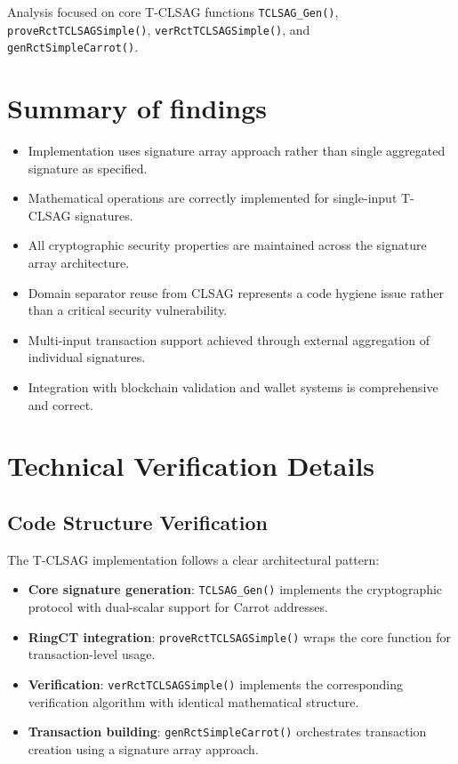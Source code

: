 \documentclass{article}
\begin{document}
Analysis focused on core T-CLSAG functions \texttt{TCLSAG\_Gen()}, \\
\texttt{proveRctTCLSAGSimple()}, \texttt{verRctTCLSAGSimple()}, and \\
\texttt{genRctSimpleCarrot()}.

\section{Summary of findings}
\begin{itemize}
  \item Implementation uses signature array approach rather than single 
        aggregated signature as specified.
  \item Mathematical operations are correctly implemented for single-input 
        T-CLSAG signatures.
  \item All cryptographic security properties are maintained across the 
        signature array architecture.
  \item Domain separator reuse from CLSAG represents a code hygiene issue 
        rather than a critical security vulnerability.
  \item Multi-input transaction support achieved through external aggregation 
        of individual signatures.
  \item Integration with blockchain validation and wallet systems is 
        comprehensive and correct.
\end{itemize}

\section{Technical Verification Details}

\subsection{Code Structure Verification}
The T-CLSAG implementation follows a clear architectural pattern:
\begin{itemize}
  \item \textbf{Core signature generation}: \texttt{TCLSAG\_Gen()} implements the cryptographic 
        protocol with dual-scalar support for Carrot addresses.
  \item \textbf{RingCT integration}: \texttt{proveRctTCLSAGSimple()} wraps the core function 
        for transaction-level usage.
  \item \textbf{Verification}: \texttt{verRctTCLSAGSimple()} implements the corresponding 
        verification algorithm with identical mathematical structure.
  \item \textbf{Transaction building}: \texttt{genRctSimpleCarrot()} orchestrates 
        transaction creation using a signature array approach.
\end{itemize}
\end{document}
